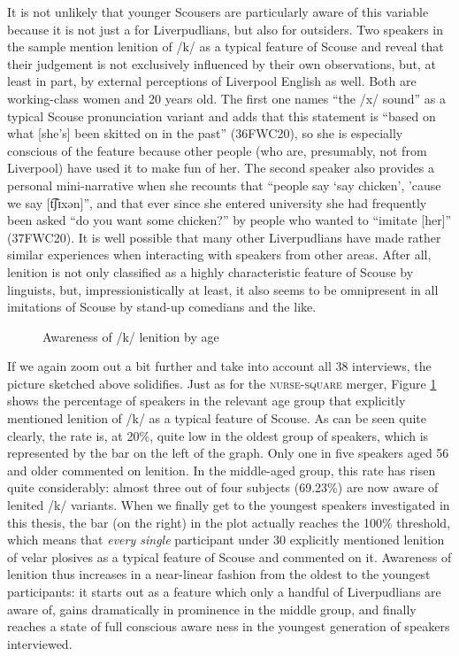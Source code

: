 It is not unlikely that younger Scousers are particularly aware  of this variable because it is not just a  for Liverpudlians, but also for outsiders.
Two speakers in the sample mention lenition of /k/ as a typical feature of Scouse and reveal that their judgement is not exclusively influenced by their own observations, but, at least in part, by external perceptions of Liverpool English as well.
Both are working-class women and 20 years old.
The first one names ``the /x/ sound'' as a typical Scouse pronunciation variant and adds that this statement is ``based on what [she's] been skitted on in the past'' (36FWC20), so she is especially conscious of the feature because other people (who are, presumably, not from Liverpool) have used it to make fun of her.
The second speaker also provides a personal mini-narrative when she recounts that ``people say `say chicken', 'cause we say [t͡ʃɪxən]'', and that ever since she entered university she had frequently been asked ``do you want some chicken?'' by people who wanted to ``imitate [her]'' (37FWC20).
It is well possible that many other Liverpudlians have made rather similar experiences when interacting with speakers from other areas.
After all, lenition is not only classified as a highly characteristic feature of Scouse by linguists, but, impressionistically at least, it also seems to be omnipresent in all imitations of Scouse by stand-up comedians and the like.

\begin{figure}[h]
	\centering
		\resizebox{.49\linewidth}{!}{} 
	\caption{Awareness of /k/ lenition by age}
	\label{fig.aware.k}
\end{figure}

If we again zoom out a bit further and take into account all 38 interviews, the picture sketched above solidifies.
Just as for the \textsc{nurse}-\textsc{square} merger, Figure \ref{fig.aware.k} shows the percentage of speakers in the relevant age group that explicitly mentioned lenition of /k/ as a typical feature of Scouse.
As can be seen quite clearly, the rate is, at 20\%, quite low in the oldest group of speakers, which is represented by the bar on the left of the graph.
Only one in five speakers aged 56 and older commented on lenition.
In the middle-aged group, this rate has risen quite considerably: almost three out of four subjects (69.23\%) are now aware  of lenited /k/ variants.
When we finally get to the youngest speakers investigated in this thesis, the bar (on the right) in the plot actually reaches the 100\% threshold, which means that \emph{every single} participant under 30 explicitly mentioned lenition of velar plosives as a typical feature of Scouse and commented on it.
Awareness of lenition thus increases in a near-linear fashion from the oldest to the youngest participants: it starts out as a feature which only a handful of Liverpudlians are aware  of, gains dramatically in prominence in the middle group, and finally reaches a state of full conscious aware ness in the youngest generation of speakers interviewed.

